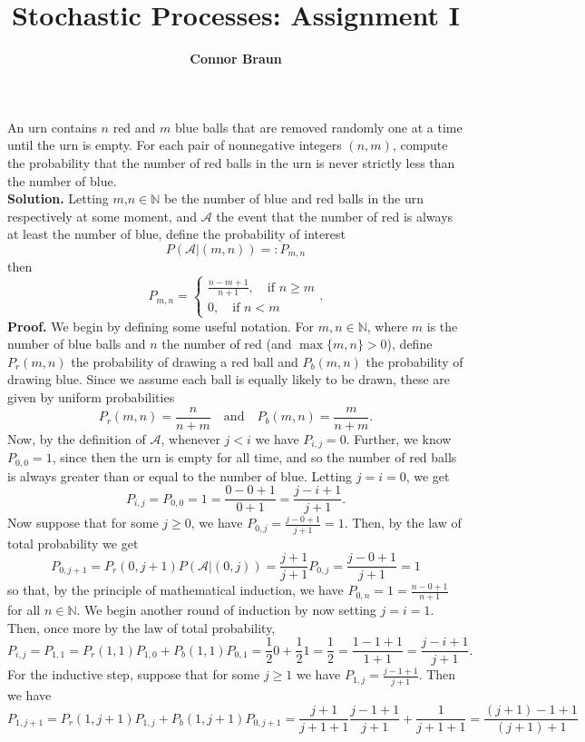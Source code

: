 \documentclass[11pt, letterpaper]{article}
\title{\bf Stochastic Processes: Assignment I}
\author{\bf Connor Braun}
\date{}
\newcommand{\mbb}[1]{\mathbb{#1}}
\newcommand{\mc}[1]{\mathcal{#1}}
\begin{document}
    \maketitle
     An urn contains $n$ red and $m$ blue balls that are removed randomly one at a time until the urn is empty. For each pair of nonnegative integers $(n,m)$, compute the probability that the 
    number of red balls in the urn is never strictly less than the number of blue.\\[10pt]
    {\bf Solution.} Letting $m$,$n\in\mbb{N}$ be the number of blue and red balls in the urn respectively at some moment, and $\mc{A}$ the event that the number of red is always at least the number of blue, define the probability of interest
    \[P(\mc{A}|(m,n))=:P_{m,n}\]
    then
    \[P_{m,n}=\begin{cases}
        \frac{n-m+1}{n+1},\quad\text{if $n\geq m$}\\
        0,\quad\text{if $n<m$}
    \end{cases}.\]
    {\bf Proof.} We begin by defining some useful notation. For $m,n\in\mbb{N}$, where $m$ is the number of blue balls and $n$ the number of red (and $\max\{m,n\}>0$), define $P_r(m,n)$ the probability of drawing a red ball and 
    $P_b(m,n)$ the probability of drawing blue. Since we assume each ball is equally likely to be drawn, these are given by uniform probabilities
    \[P_r(m,n)=\frac{n}{n+m}\quad\text{and}\quad P_b(m,n)=\frac{m}{n+m}.\]
    Now, by the definition of $\mc{A}$, whenever $j<i$ we have $P_{i,j}=0$. Further, we know $P_{0,0}=1$, since then the urn is empty for all time, and so the number of red balls is always greater than or equal to the number of blue. Letting $j=i=0$, we get
    \[P_{i,j}=P_{0,0}=1=\frac{0-0+1}{0+1}=\frac{j-i+1}{j+1}.\]
    Now suppose that for some $j\geq 0$, we have $P_{0,j}=\frac{j-0+1}{j+1}=1$.  Then, by the law of total probability we get
    \[P_{0,j+1}=P_r(0,j+1)P(\mc{A}|(0,j))=\frac{j+1}{j+1}P_{0,j}=\frac{j-0+1}{j+1}=1\]
    so that, by the principle of mathematical induction, we have $P_{0,n}=1=\frac{n-0+1}{n+1}$ for all $n\in\mbb{N}$. We begin another round of induction by now setting $j=i=1$. Then, once more by the law of total probability,
    \[P_{i,j}=P_{1,1}=P_r(1,1)P_{1,0}+P_b(1,1)P_{0,1}=\frac{1}{2}0+\frac{1}{2}1=\frac{1}{2}=\frac{1-1+1}{1+1}=\frac{j-i+1}{j+1}.\]
    For the inductive step, suppose that for some $j\geq 1$ we have $P_{1,j}=\frac{j-1+1}{j+1}$. Then we have
    \[P_{1,j+1}=P_r(1,j+1)P_{1,j}+P_b(1,j+1)P_{0,j+1}=\frac{j+1}{j+1+1}\frac{j-1+1}{j+1}+\frac{1}{j+1+1}=\frac{(j+1)-1+1}{(j+1)+1}\]
\end{document}

